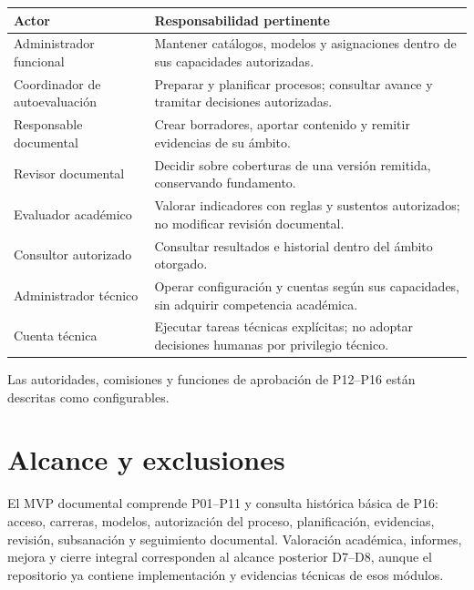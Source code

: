 \documentclass[12pt,a4paper]{report}
\begin{document}
{\def\LTcaptype{none} %
\begin{longtable}[]{@{}
  >{\raggedright\arraybackslash}p{}
  >{\raggedright\arraybackslash}p{}@{}}
\toprule\noalign{}
\begin{minipage}[b]{\linewidth}\raggedright
Actor
\end{minipage} & \begin{minipage}[b]{\linewidth}\raggedright
Responsabilidad pertinente
\end{minipage} \\
\midrule\noalign{}
\endhead
\bottomrule\noalign{}
\endlastfoot
Administrador funcional & Mantener catálogos, modelos y asignaciones
dentro de sus capacidades autorizadas. \\
Coordinador de autoevaluación & Preparar y planificar procesos;
consultar avance y tramitar decisiones autorizadas. \\
Responsable documental & Crear borradores, aportar contenido y remitir
evidencias de su ámbito. \\
Revisor documental & Decidir sobre coberturas de una versión remitida,
conservando fundamento. \\
Evaluador académico & Valorar indicadores con reglas y sustentos
autorizados; no modificar revisión documental. \\
Consultor autorizado & Consultar resultados e historial dentro del
ámbito otorgado. \\
Administrador técnico & Operar configuración y cuentas según sus
capacidades, sin adquirir competencia académica. \\
Cuenta técnica & Ejecutar tareas técnicas explícitas; no adoptar
decisiones humanas por privilegio técnico. \\
\end{longtable}
}

Las autoridades, comisiones y funciones de aprobación de P12--P16 están
descritas como configurables.

\section{Alcance y exclusiones}\label{alcance-y-exclusiones}

El MVP documental comprende P01--P11 y consulta histórica básica de P16:
acceso, carreras, modelos, autorización del proceso, planificación,
evidencias, revisión, subsanación y seguimiento documental. Valoración
académica, informes, mejora y cierre integral corresponden al alcance
posterior D7--D8, aunque el repositorio ya contiene implementación y
evidencias técnicas de esos módulos.
\end{document}
